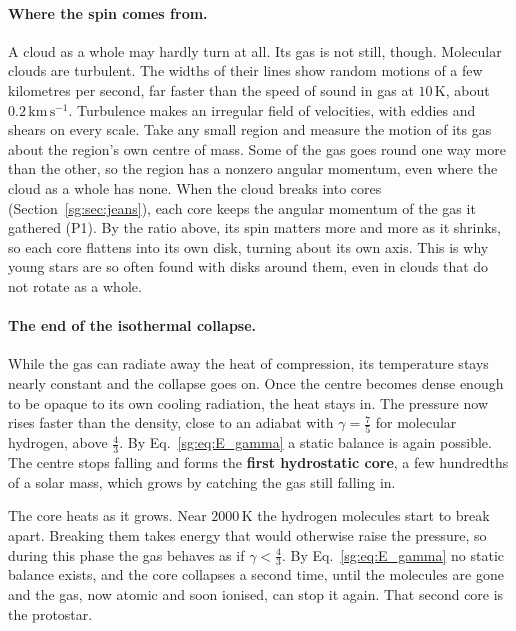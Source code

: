 \paragraph{Where the spin comes from.} A cloud as a whole may hardly turn at all. Its gas is not still, though. Molecular clouds are turbulent. The widths of their lines show random motions of a few kilometres per second, far faster than the speed of sound in gas at $10\,\mathrm K$, about $0.2\,\mathrm{km\,s^{-1}}$. Turbulence makes an irregular field of velocities, with eddies and shears on every scale. Take any small region and measure the motion of its gas about the region's own centre of mass. Some of the gas goes round one way more than the other, so the region has a nonzero angular momentum, even where the cloud as a whole has none. When the cloud breaks into cores (Section~\ref{sg:sec:jeans}), each core keeps the angular momentum of the gas it gathered (P1). By the ratio above, its spin matters more and more as it shrinks, so each core flattens into its own disk, turning about its own axis. This is why young stars are so often found with disks around them, even in clouds that do not rotate as a whole.

\paragraph{The end of the isothermal collapse.} While the gas can radiate away the heat of compression, its temperature stays nearly constant and the collapse goes on. Once the centre becomes dense enough to be opaque to its own cooling radiation, the heat stays in. The pressure now rises faster than the density, close to an adiabat with $\gamma=\tfrac75$ for molecular hydrogen, above $\tfrac43$. By Eq.~\eqref{sg:eq:E_gamma} a static balance is again possible. The centre stops falling and forms the \textbf{first hydrostatic core}, a few hundredths of a solar mass, which grows by catching the gas still falling in.

The core heats as it grows. Near $2000\,\mathrm K$ the hydrogen molecules start to break apart. Breaking them takes energy that would otherwise raise the pressure, so during this phase the gas behaves as if $\gamma<\tfrac43$. By Eq.~\eqref{sg:eq:E_gamma} no static balance exists, and the core collapses a second time, until the molecules are gone and the gas, now atomic and soon ionised, can stop it again. That second core is the protostar.

